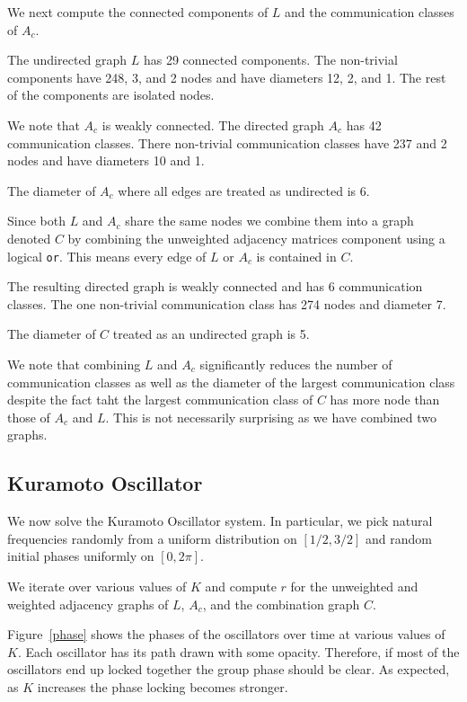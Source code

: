 \documentclass[10pt]{article}
\begin{document}
We next compute the connected components of \( L \) and the communication classes of \( A_c \).

The undirected graph \( L \) has 29 connected components. The non-trivial components have 248, 3, and 2 nodes and have diameters 12, 2, and 1. The rest of the components are isolated nodes.

We note that \( A_c \) is weakly connected. The directed graph \( A_c \) has 42 communication classes. There  non-trivial communication classes have 237 and 2 nodes and  have diameters 10 and 1.

The diameter of \( A_c \) where all edges are treated as undirected is 6.

Since both \( L \) and \( A_c \) share the same nodes we combine them into a graph denoted \( C \) by combining the unweighted adjacency matrices component using a logical {\tt or}. This means every edge of \( L \) or \( A_c \) is contained in \( C \).

The resulting directed graph is weakly connected and has 6 communication classes. The one non-trivial communication class has 274 nodes and diameter 7.

The diameter of \( C \) treated as an undirected graph is 5.

We note that combining \( L \) and \( A_c \) significantly reduces the number of communication classes as well as the diameter of the largest communication class despite the fact taht the  largest communication class of \( C \) has more node than those of \( A_c \) and \( L \). This is not necessarily surprising as we have combined two graphs.



\subsection{Kuramoto Oscillator}
We now solve the Kuramoto Oscillator system. In particular, we pick natural frequencies randomly from a uniform distribution on \( [1/2,3/2] \) and random initial phases uniformly on \( [0,2\pi] \).

We iterate over various values of \( K \) and compute \( r \) for the unweighted and weighted adjacency graphs of \( L \), \( A_c \), and the combination graph \( C \).

Figure~\ref{phase} shows the phases of the oscillators over time at various values of \( K \). Each oscillator has its path drawn with some opacity. Therefore, if most of the oscillators end up locked together the group phase should be clear. As expected, as \( K \) increases the phase locking becomes stronger.
\end{document}
